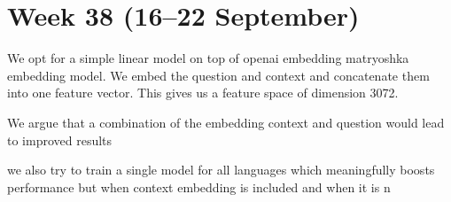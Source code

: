 \documentclass[11pt]{article}
\begin{document}
\section{Week 38 (16--22 September)}

We opt for a simple linear model on top of openai embedding matryoshka embedding model. 
We embed the question and context and concatenate them into one feature vector. 
This gives us a feature space of dimension 3072.

We argue that a combination of the embedding context and question would lead to improved results 

\begin{table}[ht]
    \centering
    \caption{Model performance for language-specific and combined training, with and without context}
    \label{tab:model_performance}
\end{table}

we also try to train a single model for all languages which meaningfully boosts performance 
but when context embedding is included and when it is n
\end{document}
